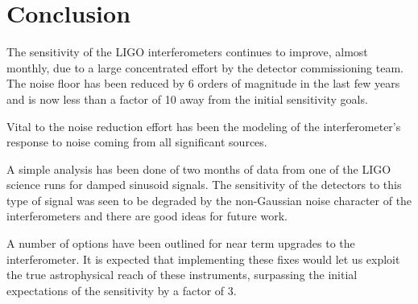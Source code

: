 %
%
%
%
\chapter*{Conclusion}

The sensitivity of the LIGO interferometers continues to improve, almost monthly,
due to a large concentrated effort by the detector commissioning team. The
noise floor has been reduced by 6 orders of magnitude in the last few years
and is now less than a factor of 10 away from the initial sensitivity goals.

Vital to the noise reduction effort has been the modeling of the interferometer's
response to noise coming from all significant sources.

A simple analysis has been done of two months of data from one of the LIGO science
runs for damped sinusoid signals. The sensitivity of the detectors to this type
of signal was seen to be degraded by the non-Gaussian noise character of the
interferometers and there are good ideas for future work.

A number of options have been outlined for near term upgrades to the interferometer.
It is expected that implementing these fixes would let us exploit the true
astrophysical reach of these instruments, surpassing the initial expectations
of the sensitivity by a factor of 3.

\clearpage

